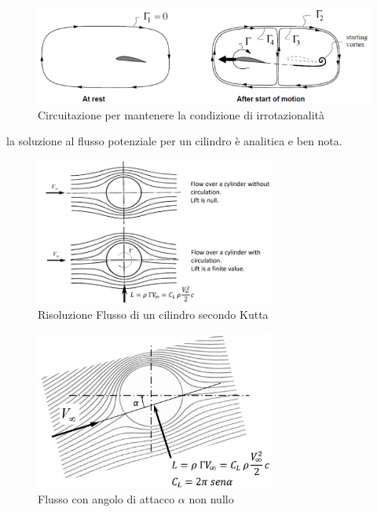 \begin{figure}
\centering
\includegraphics[width = \textwidth]{gfx/CircuitazioneKutta}
\caption{Circuitazione per mantenere la condizione di irrotazionalità}
\label{fig:CircuitazioneKutta}
\end{figure}

la soluzione al flusso potenziale per un cilindro è analitica e ben nota.

\begin{figure}
\centering
\includegraphics[width = 0.7\textwidth]{gfx/KuttaCilindro}
\caption{Risoluzione Flusso di un cilindro secondo Kutta}
\label{fig:KuttaCilindro}
\end{figure}

\begin{figure}
\centering
\includegraphics[width = 0.7\textwidth]{gfx/AngleAttack}
\caption{Flusso con angolo di attacco $\alpha$ non nullo}
\label{fig:AngleAttack}
\end{figure}